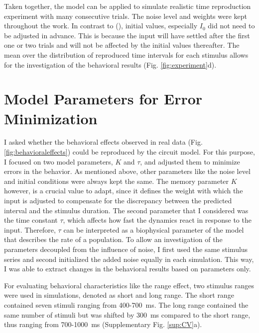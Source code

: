 \documentclass[10pt]{article}
\begin{document}
Taken together, the model can be applied to simulate realistic time reproduction experiment with many consecutive trials. The noise level and weights were kept throughout the work. 
In contrast to \citeauthor{Egger2020} (\citeyear{Egger2020}), initial values, especially $I_0$ did not need to be adjusted in advance. 
This is because the input will have settled after the first one or two trials and will not be affected by the initial values thereafter.
The mean over the distribution of reproduced time intervals for each stimulus allows for the investigation of the behavioral results (Fig. \ref{fig:experiment}d). 

\section{Model Parameters for Error Minimization}
I asked whether the behavioral effects observed in real data (Fig. \ref{fig:behavioraleffects}) could be reproduced by the circuit model.
For this purpose, I focused on two model parameters, $K$ and $\tau$, and adjusted them to minimize errors in the behavior. 
As mentioned above, other parameters like the noise level and initial conditions were always kept the same. 
The memory parameter $K$ however, is a crucial value to adapt, since it defines the weight with which the input is adjusted to compensate for the discrepancy between the predicted interval and the stimulus duration.
The second parameter that I considered was the time constant $\tau$, which affects how fast the dynamics react in response to the input. Therefore, $\tau$ can be interpreted as a biophysical parameter of the model that describes the rate of a population.
To allow an investigation of the parameters decoupled from the influence of noise, I first used the same stimulus series and second initialized the added noise equally in each simulation. This way, I was able to extract changes in the behavioral results based on parameters only.

For evaluating behavioral characteristics like the range effect, two stimulus ranges were used in simulations, denoted as short and long range. 
The short range contained seven stimuli ranging from 400-700~ms. 
The long range contained the same number of stimuli but was shifted by 300~ms compared to the short range, thus ranging from 700-1000~ms (Supplementary Fig. \ref{sup:CV}a).
 
\end{document}
